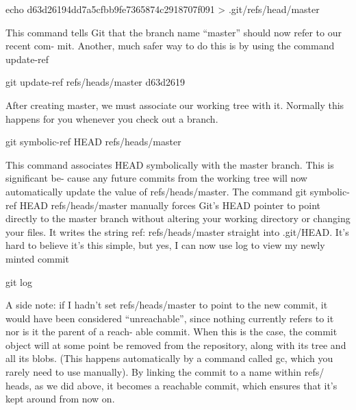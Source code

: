 \documentclass{report}
\begin{document}
\begin{itemize}
\begin{bashcode}
                echo d63d26194dd7a5cfbb9fe7365874c2918707f091 > .git/refs/head/master
            \end{bashcode}
            \bigbreak \noindent 
            This command tells Git that the branch name “master” should now refer to our recent com- mit. Another, much safer way to do this is by using the command update-ref
            \bigbreak \noindent 
            \begin{bashcode}
                git update-ref refs/heads/master d63d2619
            \end{bashcode}
            \bigbreak \noindent 
            After creating master, we must associate our working tree with it. Normally this happens for you whenever you check out a branch.
            \bigbreak \noindent 
            \begin{bashcode}
                git symbolic-ref HEAD refs/heads/master
            \end{bashcode}
            \bigbreak \noindent 
            This command associates HEAD symbolically with the master branch. This is significant be- cause any future commits from the working tree will now automatically update the value of refs/heads/master.
            \bigbreak \noindent 
            The command git symbolic-ref HEAD refs/heads/master manually forces Git's HEAD pointer to point directly to the master branch without altering your working directory or changing your files. It writes the string ref: refs/heads/master straight into .git/HEAD.
            \bigbreak \noindent 
            It’s hard to believe it’s this simple, but yes, I can now use log to view my newly minted commit
            \bigbreak \noindent 
            \begin{bashcode}
                git log
            \end{bashcode}
            \bigbreak \noindent 
            A side note: if I hadn’t set refs/heads/master to point to the new commit, it would have been considered “unreachable”, since nothing currently refers to it nor is it the parent of a reach- able commit. When this is the case, the commit object will at some point be removed from the repository, along with its tree and all its blobs. (This happens automatically by a command called gc, which you rarely need to use manually). By linking the commit to a name within refs/ heads, as we did above, it becomes a reachable commit, which ensures that it’s kept around from now on.
    \end{itemize}
\end{document}

